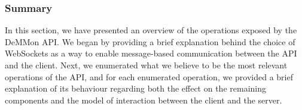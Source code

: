 \subsubsection{Summary}

In this section, we have presented an overview of the operations exposed by the DeMMon API. We began by providing a brief explanation behind the choice of WebSockets \cite{websocketsRFC} as a way to enable message-based communication between the API and the client. Next, we enumerated what we believe to be the most relevant operations of the API, and for each enumerated operation, we provided a brief explanation of its behaviour regarding both the effect on the remaining components and the model of interaction between the client and the server. 